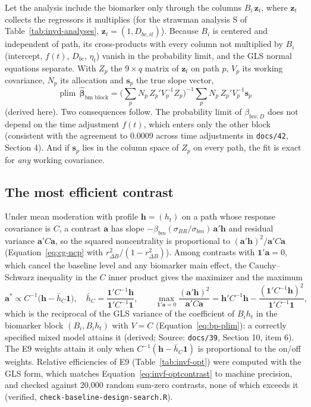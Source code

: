\documentclass[11pt]{article}
\newcommand{\code}[1]{\texttt{#1}}
\begin{document}
Let the analysis include
the biomarker only through the columns $B_i\,\mathbf z_t$, where
$\mathbf z_t$ collects the regressors it multiplies (for the strawman
analysis S of Table~\ref{tab:invd-analyses},
$\mathbf z_t = (1, D_{bc,it})$). Because $B_i$ is centered and
independent of path, its cross-products with every column not
multiplied by $B_i$ (intercept, $f(t)$, $D_{bc}$, $\eta_t$) vanish in
the probability limit, and the GLS normal equations separate. With
$Z_p$ the $9 \times q$ matrix of $\mathbf z_t$ on path $p$, $V_p$ its
working covariance, $N_p$ its allocation and $\mathbf s_p$ the true
slope vector,
\begin{equation}
\operatorname{plim}\,\hat{\boldsymbol\beta}_{\text{bm block}}
  = \Big(\sum_p N_p\, Z_p'V_p^{-1}Z_p\Big)^{-1}
    \sum_p N_p\, Z_p'V_p^{-1}\mathbf s_p
\label{eq:bp-plim}
\end{equation}
(derived here). Two consequences follow. The probability limit of
$\beta_{bm:D}$ does not depend on the time adjustment $f(t)$, which
enters only the other block (consistent with the agreement to 0.0009
across time adjustments in \code{docs/42}, Section 4). And if
$\mathbf s_p$ lies in the column space of $Z_p$ on every path, the fit
is exact for \emph{any} working covariance.

\subsection{The most efficient contrast}
\label{sec:invf-optcontrast}

Under mean moderation with profile $\mathbf h = (h_t)$ on a path whose
response covariance is $C$, a contrast $\mathbf a$ has slope
$-\beta_{bm}(\sigma_{BR}/\sigma_{bm})\,\mathbf a'\mathbf h$ and residual
variance $\mathbf a'C\mathbf a$, so the squared noncentrality is
proportional to $(\mathbf a'\mathbf h)^2/\mathbf a'C\mathbf a$
(Equation~\eqref{eq:cg-ncp} with $r^2_{\Delta B}/(1 - r^2_{\Delta B})$).
Among contrasts with $\mathbf 1'\mathbf a = 0$, which cancel the baseline
level and any biomarker main effect, the Cauchy--Schwarz inequality in the
$C$ inner product gives the maximizer and the maximum
\begin{equation}
\mathbf a^{\ast} \propto C^{-1}\big(\mathbf h - \bar h_C\mathbf 1\big),
\quad \bar h_C = \frac{\mathbf 1'C^{-1}\mathbf h}{\mathbf 1'C^{-1}\mathbf 1},
\qquad
\max_{\mathbf 1'\mathbf a = 0}\frac{(\mathbf a'\mathbf h)^2}{\mathbf a'C\mathbf a}
  = \mathbf h'C^{-1}\mathbf h - \frac{(\mathbf 1'C^{-1}\mathbf h)^2}
    {\mathbf 1'C^{-1}\mathbf 1},
\label{eq:invf-optcontrast}
\end{equation}
which is the reciprocal of the GLS variance of the coefficient of
$B_i h_t$ in the biomarker block $(B_i, B_i h_t)$ with $V = C$
(Equation~\eqref{eq:bp-plim}): a correctly specified mixed model attains
it (derived; Source: \code{docs/39}, Section 10, item 6). The E9 weights
attain it only when $C^{-1}(\mathbf h - \bar h_C\mathbf 1)$ is
proportional to the on/off weights. Relative efficiencies of E9
(Table~\ref{tab:invf-opt}) were computed with the GLS form, which
matches Equation~\eqref{eq:invf-optcontrast} to machine precision, and
checked against 20,000 random sum-zero contrasts, none of which exceeds
it (verified, \code{check-baseline-design-search.R}).
\end{document}
